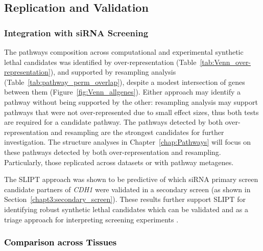 \subsection{Replication and Validation}

\subsubsection{Integration with siRNA Screening}

The \glspl{pathway} composition across computational and experimental \gls{synthetic lethal} candidates was identified by over-represent\-ation (Table~\ref{tab:Venn_over-representation}), and supported by resampling analysis (Table~\ref{tab:pathway_perm_overlap}), despite a modest intersection of genes between them (Figure~\ref{fig:Venn_allgenes}). Either approach may identify a \gls{pathway} without being supported by the other: resampling analysis may support \glspl{pathway} that were not over-represent\-ed due to small effect sizes, thus both tests are required for a candidate \gls{pathway}.
%
The \glspl{pathway} detected by both over-represent\-ation and resampling are the strongest candidates for further investigation. The  structure analyses in Chapter~\ref{chap:Pathways} will focus on these \glspl{pathway} detected by both over-representation and resampling. Particularly, those replicated across datasets or with \gls{pathway} \glspl{metagene}. %

The \gls{SLIPT} approach was shown to be predictive of which \gls{siRNA} primary screen candidate partners of \textit{CDH1} were validated in a secondary screen (as shown in Section~\ref{chapt3:secondary_screen}). These results further support \gls{SLIPT} for identifying robust \gls{synthetic lethal} candidates which can be validated and as a triage approach for interpreting screening experiments \citep{ONeil2017}.

\subsubsection{\textcolor{black}{Comparison across Tissues}}

